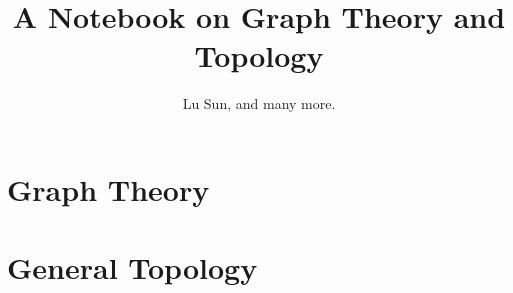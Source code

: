 

\makeindex



\frontmatter

\title{A Notebook on Graph Theory and Topology}
\author{Lu Sun, and many more.}

\maketitle


\tableofcontents


\listoffigures
\listoftables

\mainmatter

\part{Graph Theory}


\part{General Topology}






\printindex


